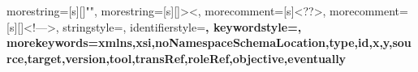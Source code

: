 {
  morestring=[s][\color{black}]{"}{"},
  morestring=[s][\color{black}]{>}{<},
  morecomment=[s]{<?}{?>},
  morecomment=[s][\color{dkgreen}]{<!--}{-->},
  stringstyle=\color{black},
  identifierstyle=\color{darkgray}\bfseries,
  keywordstyle=\color{black},
  morekeywords={xmlns,xsi,noNamespaceSchemaLocation,type,id,x,y,source,target,version,tool,transRef,roleRef,objective,eventually}%
}


\usepackage[nomargin,inline]{fixme}

\newcommand{\reffig}[1]{\figurename~\ref{#1}}
\newcommand{\reftab}[1]{Table~\ref{#1}}
\newcommand{\reflis}[1]{Listing~\ref{#1}}
\newcommand{\refappen}[1]{Appendix~\ref{#1}}
\newcommand{\refsec}[1]{Section~\ref{#1}}
\newcommand{\refsubsec}[1]{subsection~\ref{#1}}

\newcommand{\xml}[1]{\texttt{<#1>}}
\newcommand{\attr}[1]{\emph{#1}}


\usepackage{forloop}


\usepackage{lipsum}

